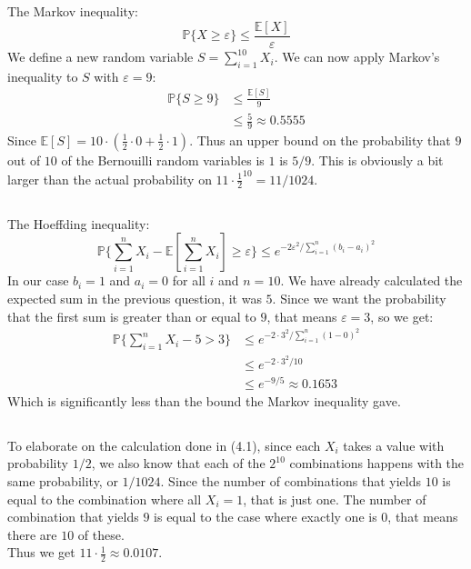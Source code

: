 \documentclass[a4paper]{article}
\begin{document}
\subsection{}
The Markov inequality:
$$\mathbb{P}\{X\geq \varepsilon \}\leq \frac{\mathbb{E}[X]}{\varepsilon}$$
We define a new random variable $S=\sum_{i=1}^{10}X_i$. We can now apply Markov's inequality to $S$ with $\varepsilon=9$: \\
\begin{align*}
\mathbb{P}\{S\geq 9\}&\leq \frac{\mathbb{E}[S]}{9} \\
&\leq \frac{5}{9}\approx 0.5555
\end{align*}
Since $\mathbb{E}[S]=10\cdot(\frac{1}{2}\cdot 0+\frac{1}{2}\cdot 1)$. Thus an upper bound on the probability that $9$ out of $10$ of the Bernouilli random variables is $1$ is $5/9$. This is obviously a bit larger than the actual probability on $11\cdot \frac{1}{2}^{10}=11/1024$.

\subsection{}
The Hoeffding inequality:
$$\mathbb{P}\{\sum_{i=1}^nX_i-\mathbb{E}\left[\sum_{i=1}^nX_i\right] \geq \varepsilon\}\leq e^{-2\varepsilon^2/\sum_{i=1}^n(b_i-a_i)^2}$$
In our case $b_i=1$ and $a_i=0$ for all $i$ and $n=10$. We have already calculated the expected sum in the previous question, it was $5$. Since we want the probability that the first sum is greater than or equal to $9$, that means $\varepsilon=3$, so we get:
\begin{align*}
\mathbb{P}\{\sum_{i=1}^nX_i-5 > 3\}&\leq e^{-2\cdot 3^2/\sum_{i=1}^n(1-0)^2} \\
&\leq e^{-2\cdot 3^2/10} \\
&\leq e^{-9/5}\approx 0.1653
\end{align*}
Which is significantly less than the bound the Markov inequality gave.

\subsection{}
To elaborate on the calculation done in (4.1), since each $X_i$ takes a value with probability $1/2$, we also know that each of the $2^10$ combinations happens with the same probability, or $1/1024$. Since the number of combinations that yields $10$ is equal to the combination where all $X_i=1$, that is just one. The number of combination that yields $9$ is equal to the case where exactly one is $0$, that means there are $10$ of these. \\Thus we get $11\cdot \frac{1}{2}\approx 0.0107$.
\end{document}
